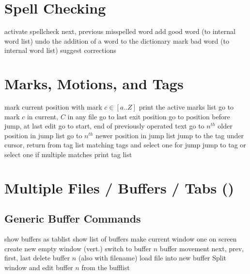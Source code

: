 \vskip -0.2cm
\section{Spell Checking}	{}
	{activate spellcheck}
\cmdS{]s\ [s }	{next, previous misspelled word}
	{add good word (to internal word list)}
	{undo the addition of a word to the dictionary}
	{mark bad word (to internal word list)}
	{suggest corrections}

\section{Marks, Motions, and Tags}	{}
	{mark current position with mark $c\in[a..Z]$}
	{print the active marks list}
	{go to mark $c$ in current, $C$ in any file}
	{go to last exit position}
	{go to position before jump, at last edit}
	{go to start, end of previously operated text}
	{go to $n^{th}$ older position in jump list}
	{go to $n^{th}$ newer position in jump list}
\cmdS{\ctrl ] \ctrl T }	{jump to the tag under cursor, return from tag}
	{list matching tags and select one for jump}
	{jump to tag or select one if multiple matches}
	{print tag list}

\section{Multiple Files / Buffers / Tabs (\enter)}	{}
\subsection{Generic Buffer Commands}	{}
	{show buffers as tablist}
	{show list of buffers}
	{make current window one on screen}
	{create new empty window (vert.)}
	{switch to buffer $n$}
	{buffer movement next, prev, first, last}
	{delete buffer $n$ (also with filename)}
	{load file into new buffer}
	{Split window and edit buffer $n$ from the bufflist}

